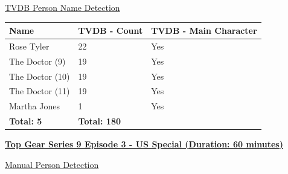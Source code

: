 \underline{TVDB Person Name Detection}
\begin{center}
\begin{tabular}{|p{160pt}|p{90pt}|p{140pt}|}
\hline
\textbf{Name}				&\textbf{TVDB - Count}		&\textbf{TVDB - Main Character}\\\hline
Rose Tyler			&22					&Yes		\\\hline
The Doctor (9)			&19					&Yes		\\\hline
The Doctor (10)		&19					&Yes		\\\hline
The Doctor (11)		&19					&Yes		\\\hline
Martha Jones			&1					&Yes		\\\hline
\textbf{Total: 5}		&\textbf{Total: 180}		&		\\\hline
\end{tabular}
\end{center}

\newpage
\textbf{\underline{Top Gear Series 9 Episode 3 - US Special (Duration: 60 minutes)}}

\underline{Manual Person Detection}


